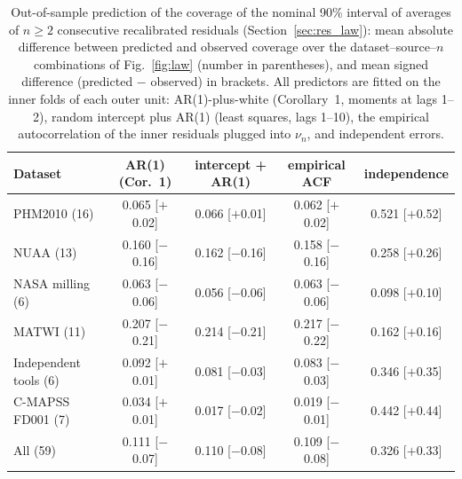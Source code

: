 \begin{table}[!htbp]
\centering
\caption{Out-of-sample prediction of the coverage of the nominal 90\% interval of averages of $n\ge2$ consecutive recalibrated residuals (Section~\ref{sec:res_law}): mean absolute difference between predicted and observed coverage over the dataset--source--$n$ combinations of Fig.~\ref{fig:law} (number in parentheses), and mean signed difference (predicted $-$ observed) in brackets. All predictors are fitted on the inner folds of each outer unit: AR(1)-plus-white (Corollary~1, moments at lags 1--2), random intercept plus AR(1) (least squares, lags 1--10), the empirical autocorrelation of the inner residuals plugged into $\nu_n$, and independent errors.}
\label{tab:Slaw}
\footnotesize\setlength{\tabcolsep}{3pt}
\begin{tabular}{lcccc}
\toprule
Dataset & AR(1) (Cor.~1) & intercept + AR(1) & empirical ACF & independence\\
\midrule
PHM2010 (16) & 0.065 [$+$0.02] & 0.066 [$+$0.01] & 0.062 [$+$0.02] & 0.521 [$+$0.52]\\
NUAA (13) & 0.160 [$-$0.16] & 0.162 [$-$0.16] & 0.158 [$-$0.16] & 0.258 [$+$0.26]\\
NASA milling (6) & 0.063 [$-$0.06] & 0.056 [$-$0.06] & 0.063 [$-$0.06] & 0.098 [$+$0.10]\\
MATWI (11) & 0.207 [$-$0.21] & 0.214 [$-$0.21] & 0.217 [$-$0.22] & 0.162 [$+$0.16]\\
Independent tools (6) & 0.092 [$+$0.01] & 0.081 [$-$0.03] & 0.083 [$-$0.03] & 0.346 [$+$0.35]\\
C-MAPSS FD001 (7) & 0.034 [$+$0.01] & 0.017 [$-$0.02] & 0.019 [$-$0.01] & 0.442 [$+$0.44]\\
\midrule
All (59) & 0.111 [$-$0.07] & 0.110 [$-$0.08] & 0.109 [$-$0.08] & 0.326 [$+$0.33]\\
\bottomrule
\end{tabular}
\end{table}
